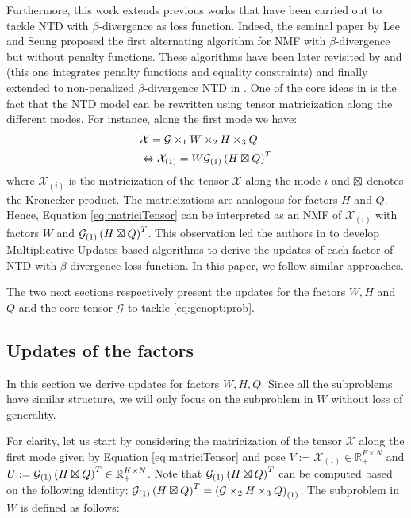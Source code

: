 \documentclass[a4paper, 11pt]{article}
\begin{document}
Furthermore, this work extends previous works that have been carried out to tackle NTD with $\beta$-divergence as loss function. Indeed, the seminal paper by Lee and Seung \cite{Lee1999Learning} proposed the first alternating algorithm for NMF with $\beta$-divergence but without penalty functions. These algorithms have been later revisited by \cite{fevotte2011algorithms} and \cite{doi:10.1137/20M1377278} (this one integrates penalty functions and equality constraints) and finally extended to non-penalized $\beta$-divergence NTD in \cite{marmoret2021nonnegative}. One of the core ideas in \cite{marmoret2021nonnegative} is the fact that the NTD model can be rewritten using tensor matricization along the different modes. For instance, along the first mode we have:
\begin{equation}\label{eq:matriciTensor}
    \begin{aligned}
        & \mathcal{X} = \mathcal{G} \times_1 W \times_2 H \times_3 Q \\
        & \Leftrightarrow \mathcal{X}_{(1)} = W \mathcal{G}_{(1)} \left( H \boxtimes Q \right)^T
    \end{aligned}
\end{equation}
where $\mathcal{X}_{(i)}$ is the matricization of the tensor $\mathcal{X}$ along the mode $i$ and $\boxtimes$ denotes the Kronecker product. The matricizations are analogous for factors $H$ and $Q$. Hence, Equation \eqref{eq:matriciTensor} can be interpreted as an NMF of $\mathcal{X}_{(i)}$ with factors $W$ and $\mathcal{G}_{(1)} \left( H \boxtimes Q \right)^T$. This observation led the authors in \cite{marmoret2021nonnegative} to develop Multiplicative Updates based algorithms to derive the updates of each factor of NTD with $\beta$-divergence loss function. In this paper, we follow similar approaches.  


The two next sections respectively present the updates for the factors $W,H$ and $Q$ and the core tensor $\mathcal{G}$ to tackle \eqref{eq:genoptiprob}.

\subsection{Updates of the factors}\label{subsec_upfac}
In this section we derive updates for factors $W,H,Q$. Since all the subproblems have similar structure, we will only focus on the subproblem in $W$ without loss of generality. 

For clarity, let us start by considering the matricization of the tensor $\mathcal{X}$ along the first mode given by Equation \eqref{eq:matriciTensor} and pose $V:=\mathcal{X}_{(1)} \in \mathbb{R}_+^{F \times N}$ and $U:=\mathcal{G}_{(1)} \left( H \boxtimes Q \right)^T \in \mathbb{R}_+^{K \times N}$. Note that $\mathcal{G}_{(1)} \left( H \boxtimes Q \right)^T$ can be computed based on the following identity: $\mathcal{G}_{(1)} \left( H \boxtimes Q \right)^T=\left(\mathcal{G} \times_2 H \times_3 Q \right)_{(1)}$.
The subproblem in $W$ is defined as follows:
\end{document}
